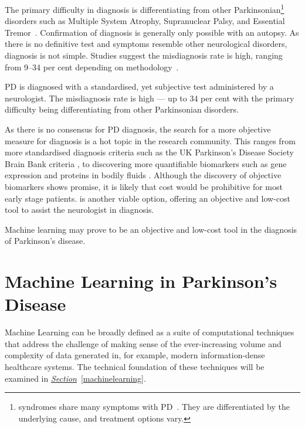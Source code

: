 \documentclass[12pt, twoside]{book}
\renewcommand\emph[1]{\textit{\color{USred}{#1}}}
\begin{document}



The primary difficulty in diagnosis is differentiating from other Parkinsonian\footnote{\emph{Parkinsonian} syndromes share many symptoms with PD~\cite{parkinsonian}. They are differentiated by the underlying cause, and treatment options vary. } disorders such as Multiple System Atrophy, Supranuclear Palsy, and Essential Tremor~\cite{hughes2002accuracy,parkinsonismdifferential1}. Confirmation of diagnosis is generally only possible with an autopsy. As there is no definitive test and symptoms resemble other neurological disorders, diagnosis is not simple. Studies suggest the misdiagnosis rate is high, ranging from 9--34 per cent depending on methodology~\cite{tolosadiagnosis26, brooksdiagnosis25, jankovic2000evolution}. 


\begin{highlight}[Diagnosis]
PD is diagnosed with a standardised, yet subjective test administered by a neurologist. The misdiagnosis rate is high --- up to 34 per cent with the primary difficulty being differentiating from other Parkinsonian disorders.
\end{highlight}

As there is no consensus for PD diagnosis, the search for a more objective measure for diagnosis is a hot topic in the research community. This ranges from more standardised diagnosis criteria such as the UK Parkinson's Disease Society Brain Bank criteria \cite{tolosadiagnosis26,brainbank,hughesdiagnosis100}, to discovering more quantifiable biomarkers such as gene expression \cite{genemarkers, genome} and proteins in bodily fluids \cite{biomarkerfluid}. Although the discovery of objective biomarkers shows promise, it is likely that cost would be prohibitive for most early stage patients. \emph{Machine learning} is another viable option, offering an objective and low-cost tool to assist the neurologist in diagnosis.

\begin{highlight}
Machine learning may prove to be an objective and low-cost tool in the diagnosis of Parkinson's disease.
\end{highlight}

\section{Machine Learning in Parkinson's Disease}
\label{mlpd}
Machine Learning can be broadly defined as a suite of computational techniques that address the challenge of making sense of the ever-increasing volume and complexity of data generated in, for example, modern information-dense healthcare systems. The technical foundation of these techniques will be examined in \textit{\hyperref[machinelearning]{Section}}~\ref{machinelearning}.
\end{document}
